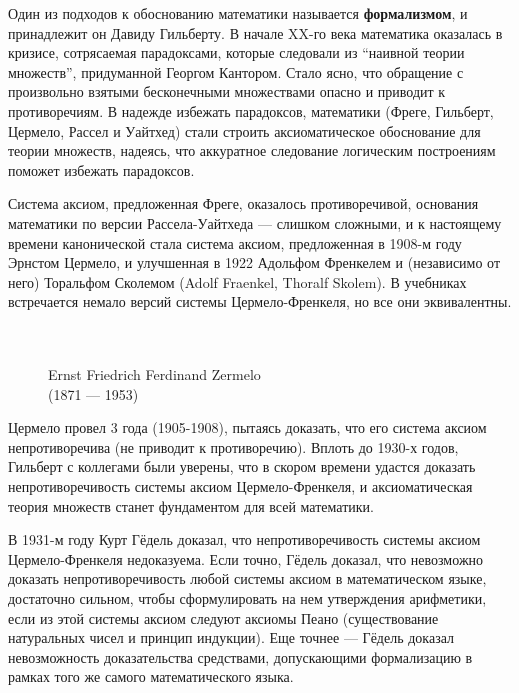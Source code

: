\documentclass[12pt]{book}
\theoremstyle{upshape}
\theoremstyle{generic}
\theoremstyle{upshapenonumber}
\newcommand{\следствие}{%
     \refstepcounter{teorema}
     {\noindent\bf Следствие \thechapter.\arabic{teorema}:\ }}
\newcommand{\пример}{%
     \refstepcounter{teorema}
     {\noindent\bf Пример \thechapter.\arabic{teorema}:\ }}
\newcommand{\лемма}{%
     \refstepcounter{teorema}
     {\noindent\bf Лемма \thechapter.\arabic{teorema}:\ }}
\newcommand{\теорема}{%
     \refstepcounter{teorema}
     {\noindent\bf Теорема \thechapter.\arabic{teorema}:\ }}
\newcommand{\утверждение}{%
     \refstepcounter{teorema}
     {\noindent\bf Утверждение \thechapter.\arabic{teorema}:\ }}
\def\бф{\bf}
\begin{document}

Один из подходов к обоснованию математики 
называется {\бф формализмом}, и принадлежит он 
Давиду Гильберту. В начале XX-го века 
математика оказалась в кризисе, сотрясаемая
парадоксами, которые следовали
из ``наивной теории множеств'', придуманной Георгом
Кантором. Стало ясно, что обращение с произвольно
взятыми бесконечными множествами опасно и приводит
к противоречиям. В надежде избежать парадоксов, 
математики (Фреге, Гильберт, Цермело, Рассел и Уайтхед)
стали строить аксиоматическое обоснование
для теории множеств, надеясь, что аккуратное
следование логическим построениям поможет
избежать парадоксов. 

Система аксиом, предложенная Фреге, оказалось
противоречивой, основания математики по версии
Рассела-Уайтхеда --- слишком сложными, и к настоящему
времени канонической стала система аксиом, 
предложенная в 1908-м году Эрнстом Цермело,
и улучшенная в 1922 Адольфом Френкелем и 
(независимо от него) Торальфом Сколемом
(Adolf Fraenkel, Thoralf Skolem). 
В учебниках встречается немало 
версий системы Цермело-Френкеля,
но все они эквивалентны.

\begin{figure}[ht]
\begin{center}\ \\
\\
{Ernst Friedrich Ferdinand Zermelo\\
(1871 --- 1953)}
\end{center}
\end{figure}


Цермело провел 3 года (1905-1908),
пытаясь доказать, что его система аксиом
непротиворечива (не приводит к противоречию).
Вплоть до 1930-х годов, Гильберт с коллегами были
уверены, что в скором времени удастся доказать
непротиворечивость системы аксиом Цермело-Френкеля,
и аксиоматическая теория множеств станет фундаментом
для всей математики. 

В 1931-м году Курт Гёдель доказал, что 
непротиворечивость системы аксиом Цермело-Френкеля недоказуема.
Если точно, Гёдель доказал, что 
невозможно доказать непротиворечивость 
любой системы аксиом в математическом языке,
достаточно сильном, чтобы сформулировать
на нем утверждения арифметики, если из этой системы
аксиом следуют аксиомы Пеано (существование 
натуральных чисел и принцип индукции).
Еще точнее --- Гёдель доказал невозможность
доказательства средствами, допускающими 
формализацию в рамках того же самого 
математического языка.
\end{document}
